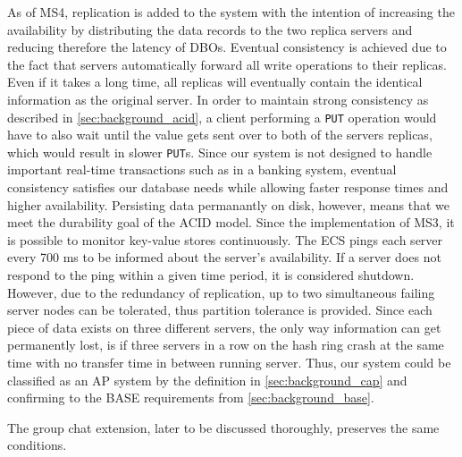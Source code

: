 
As of MS4, replication is added to the system with the intention of increasing the availability by distributing the data records to the two replica servers and reducing therefore the latency of DBOs. Eventual consistency is achieved due to the fact that servers automatically forward all write operations to their replicas. Even if it takes a long time, all replicas will eventually contain the identical information as the original server. In order to maintain strong consistency as described in \ref{sec:background_acid}, a client performing a \texttt{PUT} operation would have to also wait until the value gets sent over to both of the servers replicas, which would result in slower \texttt{PUT}s. Since our system is not designed to handle important real-time transactions such as in a banking system, eventual consistency satisfies our database needs while allowing faster response times and higher availability. Persisting data permanantly on disk, however, means that we meet the durability goal of the ACID model.
Since the implementation of MS3, it is possible to monitor key-value stores continuously. The ECS pings each server every 700 ms to be informed about the server's availability. If a server does not respond to the ping within a given time period, it is considered shutdown. However, due to the redundancy of replication,
up to two simultaneous failing server nodes can be tolerated, thus partition tolerance is provided. Since each piece of data exists on three different servers, the only way information can get permanently lost, is if three servers in a row on the hash ring crash at the same time with no transfer time in between running server.
Thus, our system could be classified as an AP system by the definition in \ref{sec:background_cap} and confirming to the BASE requirements from \ref{sec:background_base}.

The group chat extension, later to be discussed thoroughly, preserves the same conditions.

